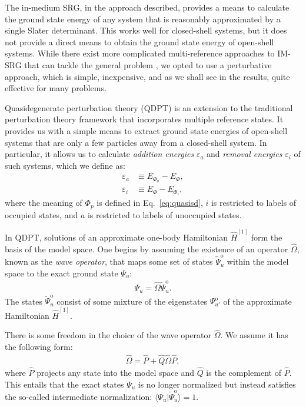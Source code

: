The in-medium SRG, in the approach described, provides a means to
calculate the ground state energy of any system that is reasonably
approximated by a single Slater determinant.  This works well for
closed-shell systems, but it does not provide a direct means to obtain
the ground state energy of open-shell systems.  While there exist more
complicated multi-reference approaches to IM-SRG that can tackle the
general problem \cite{Hergert2016165}, we opted to use a perturbative
approach, which is simple, inexpensive, and as we shall see in the
results, quite effective for many problems.

Quasidegenerate perturbation theory (QDPT) is an extension to the
traditional perturbation theory framework that incorporates multiple
reference states.  It provides us with a simple means to extract
ground state energies of open-shell systems that are only a few
particles away from a closed-shell system.  In particular, it allows
us to calculate \textit{addition energies} $\varepsilon_a$
and \textit{removal energies} $\varepsilon_i$ of such systems, which
we define as:
\begin{align}
  \varepsilon_a &\equiv E_{\Phi_a} - E_{\Phi}, \\
  \varepsilon_i &\equiv E_{\Phi} - E_{\Phi_i},
\end{align}
where the meaning of $\Phi_p$ is defined in Eq.~\eqref{eq:quasisd},
$i$ is restricted to labels of occupied states, and $a$ is restricted
to labels of unoccupied states.

In QDPT, solutions of an approximate one-body Hamiltonian
$\hat{H}^{[1]}$ form the basis of the model space.  One begins by
assuming the existence of an operator $\hat{\Omega}$, known as
the \textit{wave operator}, that maps some set of states
$\tilde \Psi^{\mathrm{o}}_u$ within the model space to the exact
ground state $\Psi_u$:
\begin{align} \label{eq:omega-condition1}
  \Psi_u = \hat \Omega \tilde \Psi^{\mathrm{o}}_u.
\end{align}
The states $\tilde \Psi^{\mathrm{o}}_u$ consist of some mixture of the
eigenstates $\Psi^{\mathrm{o}}_{u'}$ of the approximate Hamiltonian
$\hat{H}^{[1]}$.

There is some freedom in the choice of the wave operator $\hat \Omega$.  We assume it has the following form:
\begin{align} \label{eq:omega-condition2}
  \hat \Omega = \hat P + \hat Q \hat \Omega \hat P,
\end{align}
where $\hat P$ projects any state into the model space and $\hat Q$ is
the complement of $\hat P$.  This entails that the exact states
$\Psi_u$ is no longer normalized but instead satisfies the so-called
intermediate normalization: $\langle \Psi_u | \tilde \Psi^{\mathrm{o}}_u \rangle = 1$.


